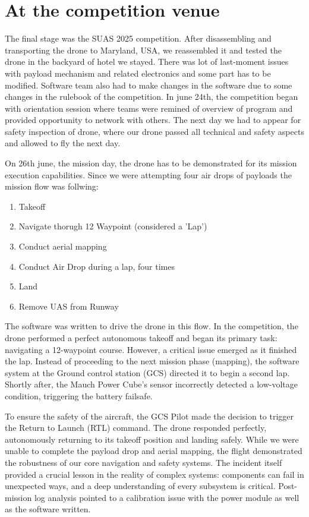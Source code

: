 \section{At the competition venue}
The final stage was the SUAS 2025 competition. After disassembling and transporting the drone to Maryland, USA, we reassembled it and tested the drone in the backyard of hotel we stayed. There was lot of last-moment issues with payload mechanism and related electronics and some part has to be modified. Software team also had to make changes in the software due to some changes in the rulebook of the competition. In june 24th, the competition began with orientation session where teams were remined of overview of program and provided opportunity to network with others. The next day we had to appear for safety inspection of drone, where our drone passed all technical and safety aspects and allowed to fly the next day.

\vspace*{.5cm}



On 26th june, the mission day, the drone has to be demonstrated for its mission execution capabilities. Since we were attempting four air drops of payloads the mission flow was follwing:
\begin{enumerate}
	\item Takeoff
	\item Navigate thorugh 12 Waypoint (considered a 'Lap')
	\item Conduct aerial mapping
	\item Conduct Air Drop during a lap, four times
	\item Land
	\item Remove UAS from Runway
\end{enumerate}

The software was written to drive the drone in this flow.
In the competition, the drone performed a perfect autonomous takeoff and began its primary task: navigating a 12-waypoint course. However, a critical issue emerged as it finished the lap. Instead of proceeding to the next mission phase (mapping), the software system at the Ground control station (GCS) directed it to begin a second lap. Shortly after, the Mauch Power Cube's sensor incorrectly detected a low-voltage condition, triggering the battery failsafe.

To ensure the safety of the aircraft, the GCS Pilot made the decision to trigger the Return to Launch (RTL) command. The drone responded perfectly, autonomously returning to its takeoff position and landing safely. While we were unable to complete the payload drop and aerial mapping, the flight demonstrated the robustness of our core navigation and safety systems. The incident itself provided a crucial lesson in the reality of complex systems: components can fail in unexpected ways, and a deep understanding of every subsystem is critical. Post-mission log analysis pointed to a calibration issue with the power module as well as the software written.

